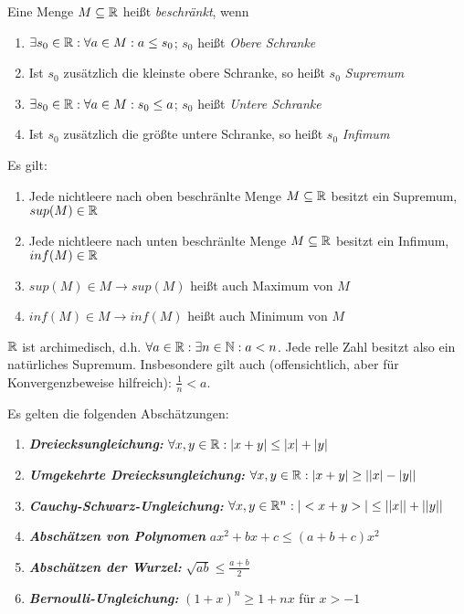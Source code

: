 \documentclass[]{article}
\begin{document}
\begin{definition}
	Eine Menge $M \subseteq \mathbb{R}$ heißt \emph{beschränkt}, wenn
	\begin{enumerate}[noitemsep]
		\item $\exists s_0 \in \mathbb{R} : \forall a \in M : a \leq s_0$; $s_0$ heißt \emph{Obere Schranke}
		\item Ist $s_0$ zusätzlich die kleinste obere Schranke, so heißt $s_0$ \emph{Supremum}
		\item $\exists s_0 \in \mathbb{R} : \forall a \in M : s_0 \leq a$; $s_0$ heißt \emph{Untere Schranke}
		\item Ist $s_0$ zusätzlich die größte untere Schranke, so heißt $s_0$ \emph{Infimum}
	\end{enumerate}
\end{definition}

\begin{satz}[Supremumsaxiom]
	Es gilt:
	\begin{enumerate}[noitemsep]
		\item Jede nichtleere nach oben beschränlte Menge $M \subseteq \mathbb{R}$ besitzt ein Supremum, $sup(M) \in \mathbb{R}$
		\item Jede nichtleere nach unten beschränlte Menge $M \subseteq \mathbb{R}$ besitzt ein Infimum, $inf(M) \in \mathbb{R}$
		\item $sup(M) \in M \rightarrow sup(M)$ heißt auch Maximum von $M$
		\item $inf(M) \in M \rightarrow inf(M)$ heißt auch Minimum von $M$
	\end{enumerate}
\end{satz}

\begin{satz}[Archimedizität]
	$\mathbb{R}$ ist archimedisch, d.h. $\forall a \in \mathbb{R} : \exists n \in \mathbb{N} : a < n $. Jede relle Zahl besitzt also ein natürliches Supremum. Insbesondere gilt auch (offensichtlich, aber für Konvergenzbeweise hilfreich): $\frac{1}{n} < a$.
\end{satz}

\begin{satz}[Abschätzungen]
	Es gelten die folgenden Abschätzungen:
	
	\begin{enumerate}[noitemsep]
		\item \textbf{\emph{Dreiecksungleichung:}} $\forall x,y \in \mathbb{R} : | x + y | \leq |x| + |y|$
		\item \textbf{\emph{Umgekehrte Dreiecksungleichung:}} 	$\forall x,y \in \mathbb{R} : | x + y | \geq ||x| - |y||$
		\item \textbf{\emph{Cauchy-Schwarz-Ungleichung:}} 	$\forall x,y \in \mathbb{R}^n : | <x + y> | \leq ||x|| + ||y||$
		\item \textbf{\emph{Abschätzen von Polynomen}} 	$ax^2 + bx + c \leq (a + b + c)x^2 $
		\item \textbf{\emph{Abschätzen der Wurzel:}} 	$\sqrt{ab} \leq \frac{a + b}{2}$
		\item \textbf{\emph{Bernoulli-Ungleichung:}} 	$(1+x)^n \geq 1 + nx$ für $x > -1$	
	\end{enumerate}
	
\end{satz}
\end{document}
